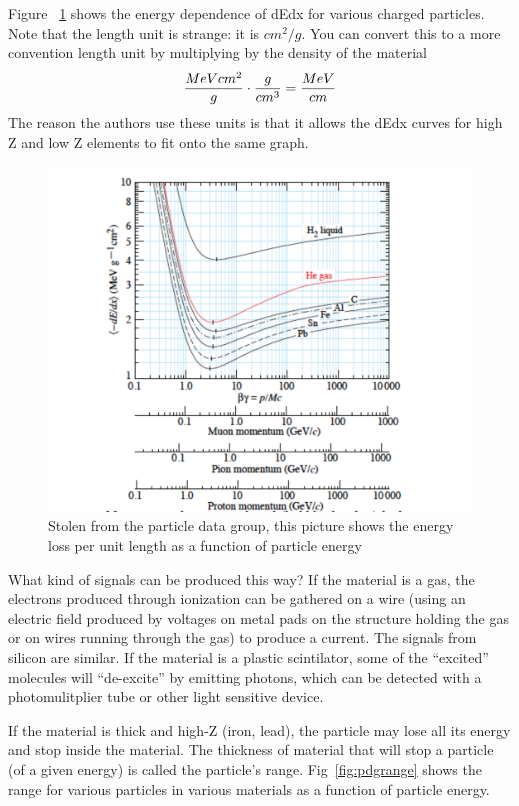 Figure ~\ref{fig:pdgdedx} shows the energy dependence of dEdx for various charged particles.  Note that the length unit is strange: it is $cm^2/g$.  You can convert this to a more convention length unit by multiplying by the density of the material
\begin{equation}
{{MeV cm^2}\over{g}} \cdot {{g}\over{cm^3}} = {{MeV}\over{cm}}
\end{equation}
The reason the authors use these units is that it allows the dEdx curves for high Z and low Z elements to fit onto the same graph.

\begin{figure}[h]
\centering\includegraphics[scale=0.5]{./particleinteractions/Pictures/dedx.pdf}
\caption{Stolen from the particle data group, this picture shows the energy
loss per unit length as a function of particle energy}
\label{fig:pdgdedx}
\end{figure}

What kind of signals can be produced this way?  If the material is a gas, the electrons produced through ionization can be gathered on a wire (using an electric field produced by voltages on metal pads on the structure holding the gas or on wires running through the gas) to produce a current.  The signals from silicon are similar.  If the material is a plastic scintilator, some of the ``excited'' molecules will ``de-excite'' by emitting photons, which can be detected with a photomulitplier tube or other light sensitive device.

If the material is thick and high-Z (iron, lead), the particle may lose all its energy and 
stop inside the material.  The thickness of material that will stop a particle (of a given energy) is called the particle's range.  Fig~\ref{fig:pdgrange} shows the range for various particles in various materials as a function of particle energy.


